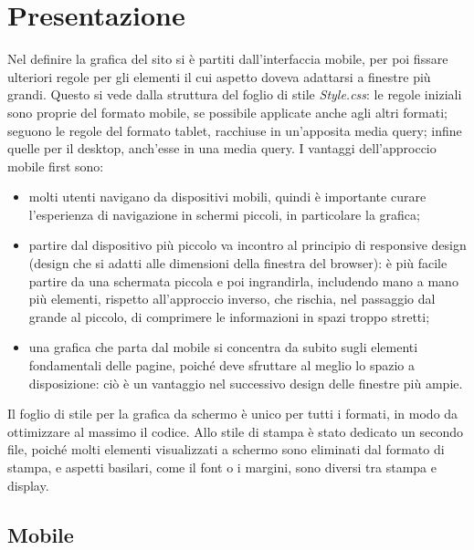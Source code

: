 \section{Presentazione}
\label{presentazione}
Nel definire la grafica del sito si è partiti dall'interfaccia mobile, per poi fissare ulteriori regole per gli elementi il cui aspetto doveva adattarsi a finestre più grandi. Questo si vede dalla struttura del foglio di stile \textit{Style.css}: le regole iniziali sono proprie del formato mobile, se possibile applicate anche agli altri formati; seguono le regole del formato tablet, racchiuse in un'apposita media query; infine quelle per il desktop, anch'esse in una media query. I vantaggi dell'approccio mobile first sono:
\begin{itemize}
	\item molti utenti navigano da dispositivi mobili, quindi è importante curare l'esperienza di navigazione in schermi piccoli, in particolare la grafica;
	
	\item partire dal dispositivo più piccolo va incontro al principio di responsive design (design che si adatti alle dimensioni della finestra del browser): è più facile partire da una schermata piccola e poi ingrandirla, includendo mano a mano più elementi, rispetto all'approccio inverso, che rischia, nel passaggio dal grande al piccolo,  di comprimere le informazioni in spazi troppo stretti;
	
	\item una grafica che parta dal mobile si concentra da subito sugli elementi fondamentali delle pagine, poiché deve sfruttare al meglio lo spazio a disposizione: ciò è un vantaggio nel successivo design delle finestre più ampie.
\end{itemize}

Il foglio di stile per la grafica da schermo è unico per tutti i formati, in modo da ottimizzare al massimo il codice. Allo stile di stampa è stato dedicato un secondo file, poiché molti elementi visualizzati a schermo sono eliminati dal formato di stampa, e aspetti basilari, come il font o i margini, sono diversi tra stampa e display.

\subsection{Mobile}
\label{presentazione-mobile}

